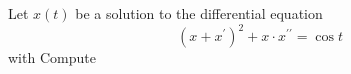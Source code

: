 Let $x(t)$ be a solution to the differential equation \[\left(x+x^\prime\right)^2+x\cdot x^{\prime\prime}=\cos t\] with   Compute 